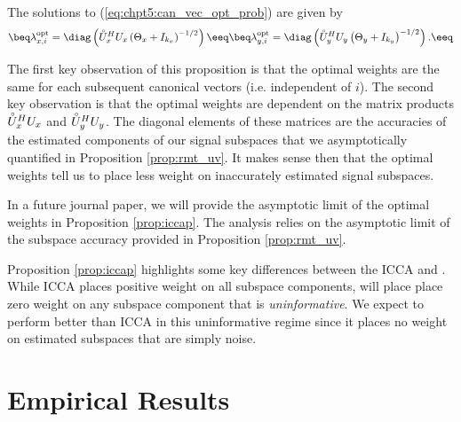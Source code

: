 \begin{prop}\label{prop:iccap}
The solutions to (\ref{eq:chpt5:can_vec_opt_prob}) are given by
\begin{subequations}\label{eq:chpt5:can_opt_sol}
\beq
\lambda_{x,i}^{\text{opt}} =
\diag\left(\Uxcir^H\Ux\left(\Tx+I_{\kx}\right)^{-1/2}\right)
\eeq
\beq
\lambda_{y,i}^{\text{opt}} =
\diag\left(\Uycir^H\Uy\left(\Ty+I_{\ky}\right)^{-1/2}\right).
\eeq
\end{subequations}
\end{prop}

The first key observation of this proposition is that the optimal weights are the same for
each subsequent canonical vectors (i.e. independent of $i$). The second key observation is
that the optimal weights are dependent on the matrix products $\accentset{\circ}{U}_x^HU_x$ and
$\accentset{\circ}{U}_y^HU_y$. The diagonal elements of these matrices are the accuracies of the estimated
components of our signal subspaces that we asymptotically quantified in Proposition
\ref{prop:rmt_uv}. It makes sense then that the optimal weights tell us to place less
weight on inaccurately estimated signal subspaces. 

In a future journal paper, we will provide the asymptotic limit of
the optimal weights in Proposition \ref{prop:iccap}. The analysis relies on the asymptotic
limit of the subspace accuracy provided in Proposition \ref{prop:rmt_uv}.

Proposition \ref{prop:iccap} highlights some key differences between the ICCA and \iccaps. While
ICCA places positive weight on all subspace components, \iccaps will place place zero
weight on any subspace component that is \textit{uninformative}. We expect \iccap to
perform better than ICCA in this uninformative regime since it places no weight on
estimated subspaces that are simply noise.

\section{Empirical Results}\label{sec:chpt5:emp}

